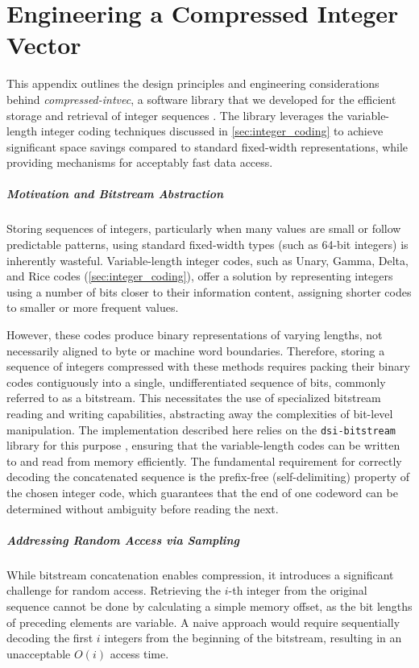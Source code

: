 \appendix
\chapter{Engineering a Compressed Integer Vector}
\label{app:compressed_intvec_engineering}

\noindent This appendix outlines the design principles and engineering considerations behind \emph{compressed-intvec}, a software library that we developed for the efficient storage and retrieval of integer sequences \cite{compressed-intvec}. The library leverages the variable-length integer coding techniques discussed in \autoref{sec:integer_coding} to achieve significant space savings compared to standard fixed-width representations, while providing mechanisms for acceptably fast data access.

\paragraph{Motivation and Bitstream Abstraction}
Storing sequences of integers, particularly when many values are small or follow predictable patterns, using standard fixed-width types (such as 64-bit integers) is inherently wasteful. Variable-length integer codes, such as Unary, Gamma, Delta, and Rice codes (\autoref{sec:integer_coding}), offer a solution by representing integers using a number of bits closer to their information content, assigning shorter codes to smaller or more frequent values.

However, these codes produce binary representations of varying lengths, not necessarily aligned to byte or machine word boundaries. Therefore, storing a sequence of integers compressed with these methods requires packing their binary codes contiguously into a single, undifferentiated sequence of bits, commonly referred to as a bitstream. This necessitates the use of specialized bitstream reading and writing capabilities, abstracting away the complexities of bit-level manipulation. The implementation described here relies on the \texttt{dsi-bitstream} library for this purpose \cite{dsi-bitstream}, ensuring that the variable-length codes can be written to and read from memory efficiently. The fundamental requirement for correctly decoding the concatenated sequence is the prefix-free (self-delimiting) property of the chosen integer code, which guarantees that the end of one codeword can be determined without ambiguity before reading the next.

\paragraph{Addressing Random Access via Sampling}
While bitstream concatenation enables compression, it introduces a significant challenge for random access. Retrieving the $i$-th integer from the original sequence cannot be done by calculating a simple memory offset, as the bit lengths of preceding elements are variable. A naive approach would require sequentially decoding the first $i$ integers from the beginning of the bitstream, resulting in an unacceptable $O(i)$ access time.

